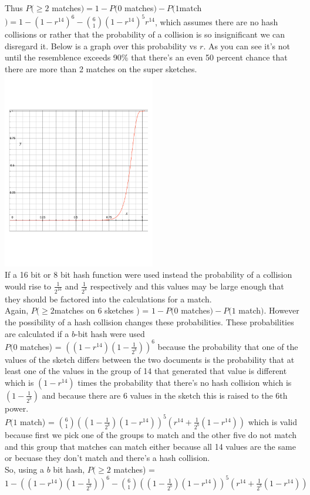 \documentclass{article}
\begin{document}
\begin{enumerate}
	Thus $P(\geq 2$ matches$) = 1 - P(0$ matches$) - P(1 $match$) = 1 - (1 - r ^{14})^6 - {6 \choose 1}(1 - r^{14})^5r^{14}$, which assumes there are no hash collisions or rather that the probability of a collision is so insignificant we can disregard it. Below is a graph over this probability vs $r$.  As you can see it's not until the resemblence exceeds 90\% that there's an even 50 percent chance that there are more than 2 matches on the super sketches.  \\
	
	\includegraphics[width=0.5\textwidth]{Graph_Question_3.pdf}
	\\
	
	If a 16 bit or 8 bit hash function were used instead the probability of a collision would rise to $\frac{1}{2^{16}}$ and $\frac{1}{2^8}$ respectively and this values may be large enough that they should be factored into the calculations for a match.  \\
	
	Again, $P(\geq 2 $matches on 6 sketches ) = $1 - P(0 $ matches$) - P(1 $ match$)$. However the possibility of a hash collision changes these probabilities. These probabilities are calculated if a $b$-bit hash were used  \\
	$P(0$ matches) = $((1 - r^{14})(1 - \frac{1}{2^b}))^6$ because the probability that one of the values of the sketch differs between the two documents is the probability that at least one of the values in the group of 14 that generated that value is different which is $(1 - r^{14})$ times the probability that there's no hash collision which is $(1 - \frac{1}{2^b})$ and because there are 6 values in the sketch this is raised to the 6th power.  \\
	$P(1$ match) = ${6\choose 1}((1 - \frac{1}{2^b})(1 - r^{14}))^5(r^{14} + \frac{1}{2^b}(1 - r^{14}))$ which is valid because first we pick one of the groups to match and the other five do not match and this group that matches can match either because all 14 values are the same or becuase they don't match and there's a hash collision.  \\
	So, using a $b$ bit hash, $P(\geq 2$ matches) = $1 - ((1 - r^{14})(1 - \frac{1}{2^b}))^6 - {6\choose 1}((1 - \frac{1}{2^b})(1 - r^{14}))^5(r^{14} + \frac{1}{2^b}(1 - r^{14}))$ \\
	

\end{enumerate}
\end{document}
